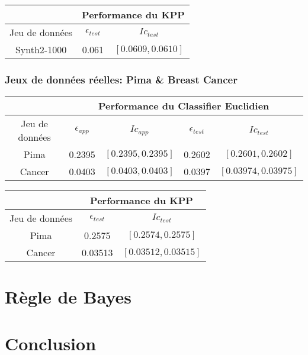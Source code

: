 \documentclass[10pt]{article}
\begin{document}
		\begin{center}		
			\begin{tabular}{ | c | c | c |}
				\rowcolor{lightgray} 
				&  \multicolumn{2}{|c|}{Performance du KPP}\\
				
				\hline
				Jeu de données &   $\epsilon_{test}$ &  $Ic_{test}$\\
				\hline
				\multirow{1}{*}{Synth2-1000}       &0.061   & $[0.0609, 0.0610]$ 			 \\
				\hline
			\end{tabular}
		\end{center}
				
				\subsubsection{ Jeux de données réelles: Pima \& Breast Cancer}
				
			
				
				
				\begin{center}		
				\begin{tabular}{ | c | c | c || c | c |}
					\rowcolor{lightgray} 
					&  \multicolumn{4}{c||}{ Performance du Classifier Euclidien}  \\
					\hline
					Jeu de données &   $\epsilon_{app}$ & $Ic_{app}$ & $\epsilon_{test}$ & $Ic_{test}$\\
					\hline
					\multirow{1}{*}{Pima}     &         0.2395  & $[0.2395, 0.2395]$		&0.2602       &		$[0.2601, 0.2602]$	 \\
					\hline
					\multirow{1}{*}{Cancer}     &        0.0403    & $[0.0403, 0.0403]$		&0.0397    &		$[ 0.03974, 0.03975]$	 \\
					\hline
					
				\end{tabular}
			\end{center}
				
				
					\begin{center}		
					\begin{tabular}{ | c | c | c |}
						\rowcolor{lightgray} 
						&  \multicolumn{2}{|c|}{Performance du KPP}\\
						
						\hline
						Jeu de données &   $\epsilon_{test}$ &  $Ic_{test}$\\
						\hline
						\multirow{1}{*}{Pima}       & 0.2575 & $[0.2574, 0.2575]$ 			 \\
						\hline
							\multirow{1}{*}{Cancer}       &0.03513   & $[0.03512, 0.03515]$ 			 \\
						\hline
					\end{tabular}
				\end{center}
				
				
				
				
						

		
	
	\section{Règle de Bayes}

	\section{Conclusion}

	
\end{document}
